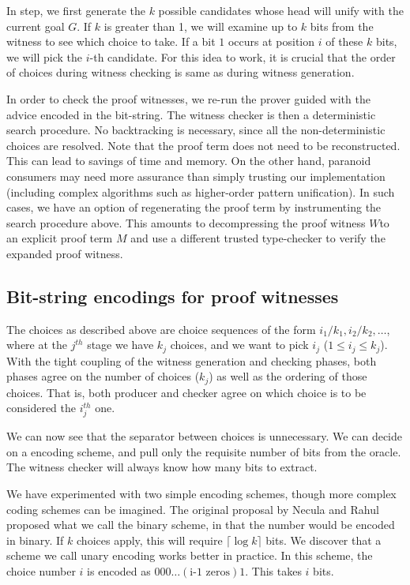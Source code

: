 \documentclass{llncs}
\begin{document}
In {} step, we first generate the $k$ possible candidates
whose head will unify with the current goal $G$. If $k$ is greater
than 1, we will examine up to $k$ bits from the witness to see which
choice to take. If a bit $1$ occurs at position $i$ of these $k$ bits,
we will pick the $i$-th candidate. For this idea to work, it is
crucial that the order of choices during witness checking is same as
during witness generation.

In order to check the proof witnesses, we re-run the prover guided
with the advice encoded in the bit-string. The witness checker is then
a deterministic search procedure. No backtracking is necessary, since
all the non-deterministic choices are resolved.
Note that the proof term does not need to be reconstructed. This can
lead to savings of time and memory. On the other hand, paranoid
consumers may need more assurance than simply trusting our
implementation (including complex algorithms such as higher-order
pattern unification). In such cases, we have an option of regenerating
the proof term by instrumenting the search procedure above.  This
amounts to decompressing the proof witness $W$to an explicit proof
term $M$ and use a different trusted type-checker to verify the
expanded proof witness.

\subsection{Bit-string encodings for proof witnesses}

The choices as described above are choice sequences of the form
$i_1/k_1,i_2/k_2,\ldots$, where at the $j^{th}$ stage we have $k_j$
choices, and we want to pick $i_j$ ($1 \leq i_j \leq k_j$). With the
tight coupling of the witness generation and checking phases, both
phases agree on the number of choices ($k_j$) as well as the ordering
of those choices. That is, both producer and checker agree on which
choice is to be considered the $i_j^{th}$ one.

We can now see that the separator between choices is unnecessary. We
can decide on a encoding scheme, and pull only the requisite number of
bits from the oracle. The witness checker will always know how many
bits to extract.

We have experimented with two simple encoding schemes, though more
complex coding schemes can be imagined. The original proposal by
Necula and Rahul proposed what we call the binary scheme, in that the
number would be encoded in binary. If $k$ choices apply, this will
require $\lceil\log k\rceil$ bits. We discover that a scheme we call
unary encoding works better in practice. In this scheme, the choice
number $i$ is encoded as $0 0 0 \ldots (\mbox{i-1 zeros}) 1$. This
takes $i$ bits.
\end{document}
